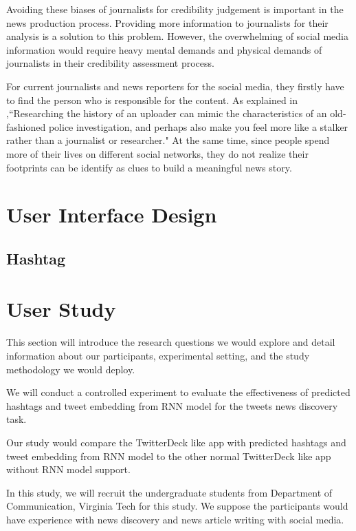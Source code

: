 Avoiding these biases of journalists for credibility judgement is important in the news production process. Providing more information to journalists for their analysis is a solution to this problem. However, the overwhelming of social media information would require heavy mental demands and physical demands of journalists in their credibility assessment process. 

For current journalists and news reporters for the social media, they firstly have to find the person who is responsible for the content. As explained in \cite{Silverman2014} ,``Researching the history of an uploader can mimic the characteristics of an old-fashioned police investigation, and perhaps also make you feel more like a stalker rather than a journalist or researcher." 
At the same time, since people spend more of their lives on different social networks, they do not realize their footprints can be identify as clues to build a meaningful news story.





\section{User Interface Design}


\subsection{Hashtag }




\section{User Study}

This section will introduce the research questions we would explore and detail information about our participants, experimental setting, and the study methodology we would deploy. 

We will conduct a controlled experiment to evaluate the effectiveness of predicted hashtags and tweet embedding from RNN model for the tweets news discovery task.    

Our study would compare the TwitterDeck like app with predicted hashtags and tweet embedding from RNN model to the other normal TwitterDeck like app without RNN model support.  

In this study, we will recruit the undergraduate students from Department of Communication, Virginia Tech for this study. We suppose the participants would have experience with news discovery and news article writing with social media.

